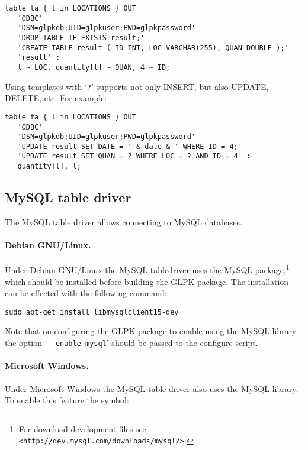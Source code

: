 \documentclass[11pt,draft]{article}
\begin{document}
\begin{small}
\begin{verbatim}
table ta { l in LOCATIONS } OUT
   'ODBC'
   'DSN=glpkdb;UID=glpkuser;PWD=glpkpassword'
   'DROP TABLE IF EXISTS result;'
   'CREATE TABLE result ( ID INT, LOC VARCHAR(255), QUAN DOUBLE );'
   'result' :
   l ~ LOC, quantity[l] ~ QUAN, 4 ~ ID;
\end{verbatim}
\end{small}

Using templates with `\verb|?|' supports not only INSERT, but also
UPDATE, DELETE, etc. For example:

\begin{small}
\begin{verbatim}
table ta { l in LOCATIONS } OUT
   'ODBC'
   'DSN=glpkdb;UID=glpkuser;PWD=glpkpassword'
   'UPDATE result SET DATE = ' & date & ' WHERE ID = 4;'
   'UPDATE result SET QUAN = ? WHERE LOC = ? AND ID = 4' :
   quantity[l], l;
\end{verbatim}
\end{small}

\subsection*{MySQL table driver}

The MySQL table driver allows connecting to MySQL databases.

\paragraph{Debian GNU/Linux.}
Under Debian GNU/Linux the MySQL table\linebreak driver uses the MySQL
package,\footnote{For download development files see
{\tt<http://dev.mysql.com/downloads/mysql/>}.} which should be installed
before building the GLPK package. The installation can be effected with
the following command:

\begin{verbatim}
sudo apt-get install libmysqlclient15-dev
\end{verbatim}

Note that on configuring the GLPK package to enable using the MySQL
library the option `\verb|--enable-mysql|' should be passed to the
configure script.

\paragraph{Microsoft Windows.}
Under Microsoft Windows the MySQL table driver also uses the MySQL
library. To enable this feature the symbol:
\end{document}
